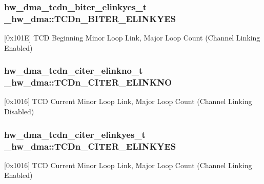 \subsubsection[{\texorpdfstring{T\+C\+Dn\+\_\+\+B\+I\+T\+E\+R\+\_\+\+E\+L\+I\+N\+K\+Y\+ES}{TCDn_BITER_ELINKYES}}]{ {\bf hw\+\_\+dma\+\_\+tcdn\+\_\+biter\+\_\+elinkyes\+\_\+t} \+\_\+hw\+\_\+dma\+::\+T\+C\+Dn\+\_\+\+B\+I\+T\+E\+R\+\_\+\+E\+L\+I\+N\+K\+Y\+ES}\hypertarget{struct__hw__dma_a326e53beefd3909503978101c7363475}{}\label{struct__hw__dma_a326e53beefd3909503978101c7363475}
\mbox{[}0x101E\mbox{]} T\+CD Beginning Minor Loop Link, Major Loop Count (Channel Linking Enabled) 
\subsubsection[{\texorpdfstring{T\+C\+Dn\+\_\+\+C\+I\+T\+E\+R\+\_\+\+E\+L\+I\+N\+K\+NO}{TCDn_CITER_ELINKNO}}]{ {\bf hw\+\_\+dma\+\_\+tcdn\+\_\+citer\+\_\+elinkno\+\_\+t} \+\_\+hw\+\_\+dma\+::\+T\+C\+Dn\+\_\+\+C\+I\+T\+E\+R\+\_\+\+E\+L\+I\+N\+K\+NO}\hypertarget{struct__hw__dma_ad68def519b24cb97395733ff2f554a69}{}\label{struct__hw__dma_ad68def519b24cb97395733ff2f554a69}
\mbox{[}0x1016\mbox{]} T\+CD Current Minor Loop Link, Major Loop Count (Channel Linking Disabled) 
\subsubsection[{\texorpdfstring{T\+C\+Dn\+\_\+\+C\+I\+T\+E\+R\+\_\+\+E\+L\+I\+N\+K\+Y\+ES}{TCDn_CITER_ELINKYES}}]{ {\bf hw\+\_\+dma\+\_\+tcdn\+\_\+citer\+\_\+elinkyes\+\_\+t} \+\_\+hw\+\_\+dma\+::\+T\+C\+Dn\+\_\+\+C\+I\+T\+E\+R\+\_\+\+E\+L\+I\+N\+K\+Y\+ES}\hypertarget{struct__hw__dma_ac7ef04b0a173ade9342c540b111f189c}{}\label{struct__hw__dma_ac7ef04b0a173ade9342c540b111f189c}
\mbox{[}0x1016\mbox{]} T\+CD Current Minor Loop Link, Major Loop Count (Channel Linking Enabled) 
